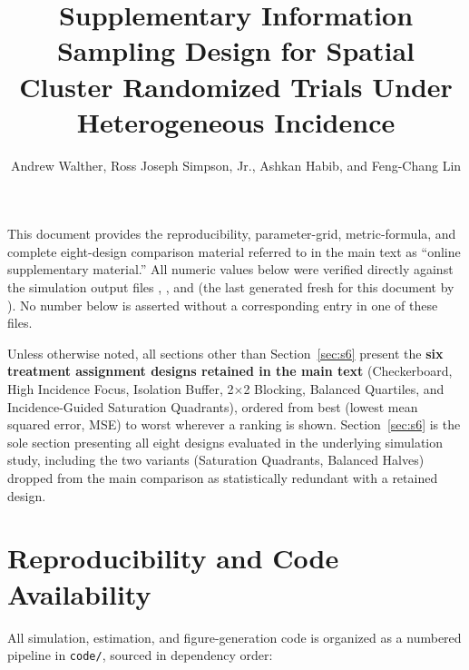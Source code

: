\documentclass[11pt]{article}
\title{Supplementary Information\\[4pt]
\large Sampling Design for Spatial Cluster Randomized Trials Under Heterogeneous Incidence}
\author{Andrew Walther, Ross Joseph Simpson, Jr., Ashkan Habib, and Feng-Chang Lin}
\date{}
\begin{document}
\maketitle

This document provides the reproducibility, parameter-grid, metric-formula, and
complete eight-design comparison material referred to in the main text as
``online supplementary material.'' All numeric values below were verified
directly against the simulation output files
,
, and
(the last generated fresh for this document by
). No number below is asserted
without a corresponding entry in one of these files.

Unless otherwise noted, all sections other than Section~\ref{sec:s6} present the
\textbf{six treatment assignment designs retained in the main text} (Checkerboard,
High Incidence Focus, Isolation Buffer, 2$\times$2 Blocking, Balanced Quartiles,
and Incidence-Guided Saturation Quadrants), ordered from best (lowest mean squared
error, MSE) to worst wherever a ranking is shown. Section~\ref{sec:s6} is the sole
section presenting all eight designs evaluated in the underlying simulation study,
including the two variants (Saturation Quadrants, Balanced Halves) dropped from the
main comparison as statistically redundant with a retained design.

\section{Reproducibility and Code Availability}
\label{sec:s1}

All simulation, estimation, and figure-generation code is organized as a
numbered pipeline in \texttt{code/}, sourced in dependency order:
\end{document}
